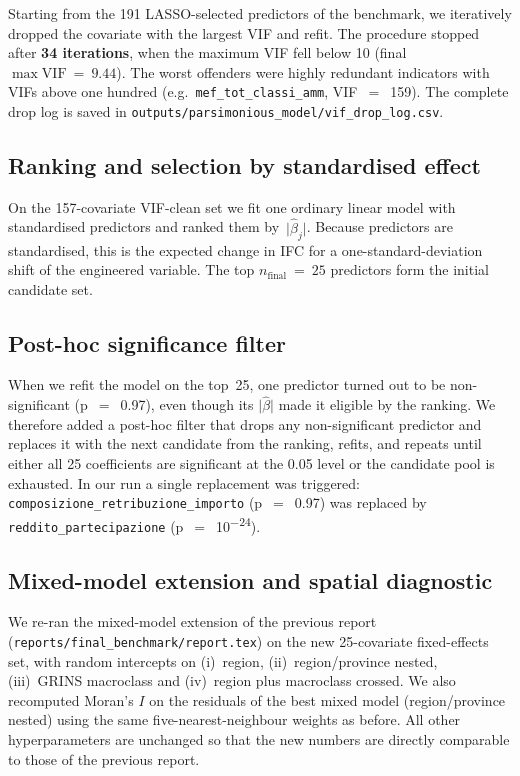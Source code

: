 \documentclass[11pt,a4paper]{article}
\begin{document}
Starting from the 191 LASSO-selected predictors of the benchmark, we
iteratively dropped the covariate with the largest VIF and refit. The
procedure stopped after \textbf{34 iterations}, when the maximum VIF
fell below 10 (final $\max\mathrm{VIF}~=~9.44$). The worst offenders
were highly redundant indicators with VIFs above one hundred (e.g.\
\texttt{mef\_tot\_classi\_amm}, VIF~$=$~159). The complete drop log is
saved in \verb|outputs/parsimonious_model/vif_drop_log.csv|.

\subsection{Ranking and selection by standardised effect}

On the 157-covariate VIF-clean set we fit one ordinary linear model
with standardised predictors and ranked them by~$\lvert
\hat\beta_j \rvert$. Because predictors are standardised, this is the
expected change in IFC for a one-standard-deviation shift of the
engineered variable. The top $n_{\text{final}}~=~25$ predictors form
the initial candidate set.

\subsection{Post-hoc significance filter}

When we refit the model on the top~25, one predictor turned out to be
non-significant (p~$=$~0.97), even though its $\lvert\hat\beta\rvert$
made it eligible by the ranking. We therefore added a post-hoc filter
that drops any non-significant predictor and replaces it with the
next candidate from the ranking, refits, and repeats until either all
25 coefficients are significant at the 0.05 level or the candidate
pool is exhausted. In our run a single replacement was triggered:
\texttt{composizione\_retribuzione\_importo} (p~$=$~0.97) was replaced
by \texttt{reddito\_partecipazione} (p~$=$~10\textsuperscript{$-24$}).

\subsection{Mixed-model extension and spatial diagnostic}

We re-ran the mixed-model extension of the previous report
(\verb|reports/final_benchmark/report.tex|) on the new 25-covariate
fixed-effects set, with random intercepts on (i)~region,
(ii)~region/province nested, (iii)~GRINS macroclass and (iv)~region
plus macroclass crossed. We also recomputed Moran's $I$ on the
residuals of the best mixed model (region/province nested) using
the same five-nearest-neighbour weights as before. All other
hyperparameters are unchanged so that the new numbers are directly
comparable to those of the previous report.
\end{document}
